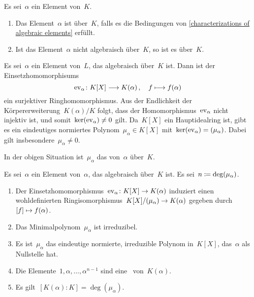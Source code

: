 \begin{definition}
  Es sei~$\alpha$ ein Element von~$K$.
  \begin{enumerate}
    \item
      Das Element~$\alpha$ ist  über~$K$, falls es die Bedingungen von \cref{characterizations of algebraic elements} erfüllt.
    \item
      Ist das Element~$\alpha$ nicht algebraisch über~$K$, so ist es  über~$K$.
  \end{enumerate}
\end{definition}

Es sei~$\alpha$ ein Element von~$L$, das algebraisch über~$K$ ist.
Dann ist der Einsetzhomomorphisums
\[
  \ev_\alpha
  \colon
  K[X] \to K(\alpha) \,,
  \quad
  f \mapsto f(\alpha)
\]
ein surjektiver Ringhomomorphismus.
Aus der Endlichkeit der Körpererweiterung~$K(\alpha)/K$ folgt, dass der Homomorphismus~$\operatorname{ev}_\alpha$ nicht injektiv ist, und somit~$\ker(\operatorname{ev}_\alpha) \neq 0$ gilt.
Da~$K[X]$ ein Hauptidealring ist, gibt es ein eindeutiges normiertes Polynom~$\mu_\alpha \in K[X]$ mit~$\ker(\operatorname{ev}_\alpha) = ( \mu_\alpha )$.
Dabei gilt insbesondere~$\mu_\alpha \neq 0$.

\begin{definition}
  In der obigen Situation ist~$\mu_\alpha$ das  von~$\alpha$ über~$K$.
\end{definition}

\begin{proposition}
  Es sei~$\alpha$ ein Element von~$\alpha$, das algebraisch über~$K$ ist.
  Es sei~$n \coloneqq \deg(\mu_\alpha)$.
  \begin{enumerate}
    \item
      Der Einsetzhomomorphismus~$\ev_\alpha \colon K[X] \to K(\alpha)$ induziert einen wohldefinierten Ringisomorphismus~$K[X] / \genideal{\mu_\alpha} \to K(\alpha)$ gegeben durch~$\class{f} \mapsto f(\alpha)$.
    \item
      Das Minimalpolynom~$\mu_\alpha$ ist irreduzibel.
    \item
      Es ist~$\mu_\alpha$ das eindeutige normierte, irreduzible Polynom in~$K[X]$, das~$\alpha$ als Nullstelle hat.
    \item
      Die Elemente~$1, \alpha, \dotsc, \alpha^{n-1}$ sind eine~ von~$K(\alpha)$.
    \item
      Es gilt~$[K(\alpha) : K] = \deg(\mu_\alpha)$.
  \end{enumerate}
\end{proposition}

